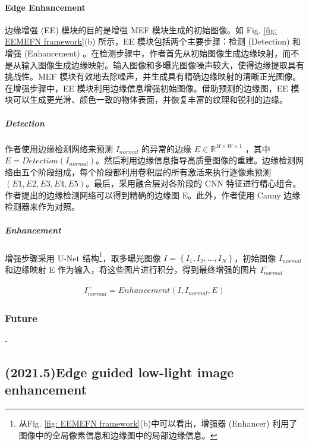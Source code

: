 \documentclass[letterpaper,10pt]{article}
\begin{document}
			\paragraph{Edge Enhancement}
			
			边缘增强 (EE) 模块的目的是增强 MEF 模块生成的初始图像。如 Fig. \ref{fig: EEMEFN framework}(b) 所示，EE 模块包括两个主要步骤：检测 (Detection) 和增强 (Enhancement) 。在检测步骤中，作者首先从初始图像生成边缘映射，而不是从输入图像生成边缘映射。输入图像和多曝光图像噪声较大，使得边缘提取具有挑战性。MEF 模块有效地去除噪声，并生成具有精确边缘映射的清晰正光图像。在增强步骤中，EE 模块利用边缘信息增强初始图像。借助预测的边缘图，EE 模块可以生成更光滑、颜色一致的物体表面，并恢复丰富的纹理和锐利的边缘。
				\subparagraph{Detection}
				
				作者使用边缘检测网络来预测 $I_{normal}$ 的异常的边缘 $E \in \mathbb{R}^{H \times W \times 1}$ ，其中 $E = Detection(I_{normal})$。然后利用边缘信息指导高质量图像的重建。边缘检测网络由五个阶段组成，每个阶段都利用卷积层的所有激活来执行逐像素预测 $(E1, E2, E3, E4, E5)$。最后，采用融合层对各阶段的 CNN 特征进行精心组合。作者提出的边缘检测网络可以得到精确的边缘图 E。此外，作者使用 Canny 边缘检测器来作为对照。
				
				\subparagraph{Enhancement}
				
				增强步骤采用 U-Net 结构\footnote{从Fig. \ref{fig: EEMEFN framework}(b)中可以看出，增强器 (Enhancer) 利用了图像中的全局像素信息和边缘图中的局部边缘信息。}，取多曝光图像 $I = \left\{I_1, I_2, \ldots , I_N\right\}$，初始图像 $I_{normal}$ 和边缘映射 E 作为输入，将这些图片进行积分，得到最终增强的图片 $I_{normal}^{+}$
				
				\begin{equation}
					\begin{aligned}
						I_{normal}^{+} = Enhancement(I, I_{normal}, E)
					\end{aligned}
					\label{eq: fusion}
				\end{equation}
			
			\subsubsection{Future}
		
			-
			
		\subsection{(2021.5)Edge guided low-light image enhancement}
			
\end{document}
